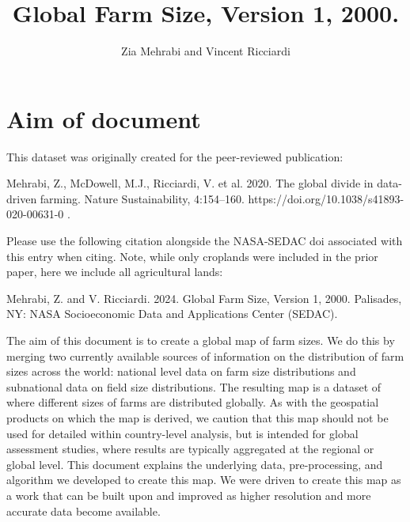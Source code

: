 \documentclass{article}\usepackage[]{graphicx}\usepackage[]{xcolor}
\title{Global Farm Size, Version 1, 2000.}
\author{Zia Mehrabi and Vincent Ricciardi}
\begin{document}






\maketitle

\tableofcontents

\newpage
\section{Aim of document}

This dataset was originally created for the peer-reviewed publication: 

Mehrabi, Z., McDowell, M.J., Ricciardi, V. et al. 2020. The global divide in data-driven farming. Nature Sustainability, 4:154–160. https://doi.org/10.1038/s41893-020-00631-0 \cite{Mehrabi}.

Please use the following citation alongside the NASA-SEDAC doi associated with this entry when citing. Note, while only croplands were included in the prior paper, here we include all agricultural lands:

Mehrabi, Z. and V. Ricciardi. 2024. Global Farm Size, Version 1, 2000. Palisades, NY: NASA Socioeconomic Data and Applications Center (SEDAC). 

The aim of this document is to create a global map of farm sizes. We do this by merging two currently available sources of information on the distribution of farm sizes across the world: national level data on farm size distributions and subnational data on field size distributions. The resulting map is a dataset of where different sizes of farms are distributed globally. As with the geospatial products on which the map is derived, we caution that this map should not be used for detailed within country-level analysis, but is intended for global assessment studies, where results are typically aggregated at the regional or global level. This document explains the underlying data, pre-processing, and algorithm we developed to create this map. We were driven to create this map as a work that can be built upon and improved as higher resolution and more accurate data become available.


\end{document}
